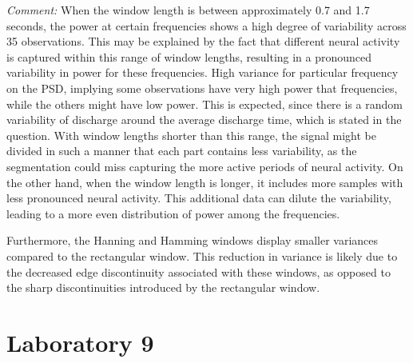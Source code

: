\documentclass[8pt]{article}  %
\theoremstyle{plain}
\theoremstyle{definition}
\theoremstyle{remark}
\begin{document}
    \textit{Comment:}
    When the window length is between approximately 0.7 and 1.7 seconds, 
    the power at certain frequencies shows a high degree of variability across 35 observations. 
    This may be explained by the fact that different neural activity is captured within this range of window lengths, 
    resulting in a pronounced variability in power for these frequencies. 
    High variance for particular frequency on the PSD, 
    implying some observations have very high power that frequencies, while the others might have low power.
    This is expected, since there is a random variability of discharge around the average discharge time, which is stated in the question.
    With window lengths shorter than this range, 
    the signal might be divided in such a manner that each part contains less variability, 
    as the segmentation could miss capturing the more active periods of neural activity. 
    On the other hand, 
    when the window length is longer, 
    it includes more samples with less pronounced neural activity. 
    This additional data can dilute the variability, 
    leading to a more even distribution of power among the frequencies.

    Furthermore, the Hanning and Hamming windows display smaller variances compared to the rectangular window. 
    This reduction in variance is likely due to the decreased edge discontinuity associated with these windows, as opposed to the sharp discontinuities introduced by the rectangular window.
    \newpage



    \section{Laboratory 9}
\end{document}
